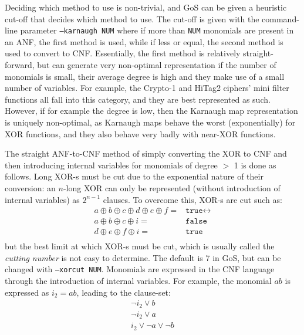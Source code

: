 \documentclass{llncs}
\begin{document}
Deciding which method to use is non-trivial, and GoS can be given a heuristic cut-off that decides which method to use. The cut-off is given with the command-line parameter \texttt{--karnaugh NUM} where if more than \texttt{NUM} monomials are present in an ANF, the first method is used, while if less or equal, the second method is used to convert to CNF. Essentially, the first method is relatively straight-forward, but can generate very non-optimal representation if the number of monomials is small, their average degree is high and they make use of a small number of variables. For example, the Crypto-1 and HiTag2 ciphers' mini filter functions all fall into this category, and they are best represented as such. However, if for example the degree is low, then the Karnaugh  map representation is uniquely non-optimal, as Karnaugh maps behave the worst (exponentially) for XOR functions, and they also behave very badly with near-XOR functions.

The straight ANF-to-CNF method of simply converting the XOR to CNF and then introducing internal variables for monomials of degree $>$ 1 is done as follows. Long XOR-s must be cut due to the exponential nature of their conversion: an $n$-long XOR can only be represented (without introduction of internal variables) as $2^{n-1}$ clauses. To overcome this, XOR-s are cut such as:
\begin{align*}
a \oplus b \oplus c \oplus d \oplus e \oplus f =& \texttt{true}
\leftrightarrow\\
a \oplus b \oplus c \oplus i =& \texttt{false}\\
d \oplus e \oplus f \oplus i =& \texttt{true}\\
\end{align*}
but the best limit at which XOR-s must be cut, which is usually called the \emph{cutting number} is not easy to determine. The default is 7 in GoS, but can be changed with \texttt{--xorcut NUM}. Monomials are expressed in the CNF language through the introduction of internal variables. For example, the monomial $ab$ is expressed as $i_2 = ab$, leading to the clause-set:
\begin{align*}
\neg i_2 \vee b\\
\neg i_2 \vee a\\
i_2 \vee \neg a \vee \neg b\\
\end{align*}
\end{document}
